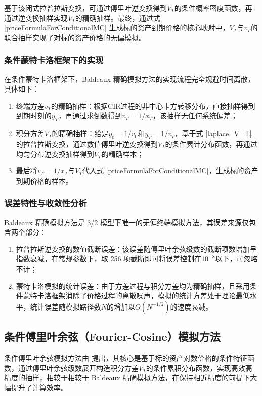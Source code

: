 基于该闭式拉普拉斯变换，可通过傅里叶逆变换得到$V_T$的条件概率密度函数，再通过逆变换抽样实现$V_T$的精确抽样。最终，通过式 \eqref{priceFormulaForConditionalMC} 生成标的资产到期价格的核心映射中，$V_T$与$v_T$的联合抽样实现了对标的资产价格的无偏模拟。

\subsubsection{条件蒙特卡洛框架下的实现}
在条件蒙特卡洛框架下，Baldeaux 精确模拟方法的实现流程完全规避时间离散，具体如下：
\begin{enumerate}
  \item 终端方差$v_T$的精确抽样：根据CIR过程的非中心卡方转移分布，直接抽样得到到期时刻的$y_T$，再通过求倒数得到$v_T = 1/x_T$，该抽样无任何系统偏差；
  \item 积分方差$V_T$的精确抽样：给定$y_0 = 1/v_0$和$y_T = 1/v_T$，基于式 \eqref{laplace_V_T} 的拉普拉斯变换，通过数值傅里叶逆变换得到$V_T$的条件累计分布函数，再通过均匀分布逆变换抽样得到$V_T$的精确样本；
  \item 最后将$v_T=1/x_T$与$V_T$代入式 \eqref{priceFormulaForConditionalMC}，生成标的资产到期价格的样本。
\end{enumerate}

\subsubsection{误差特性与收敛性分析}
Baldeaux 精确模拟方法是 3/2 模型下唯一的无偏终端模拟方法，其误差来源仅包含两个部分：
\begin{enumerate}
  \item 拉普拉斯逆变换的数值截断误差：该误差随傅里叶余弦级数的截断项数增加呈指数衰减，在常规参数下，取 256 项截断即可将误差控制在$10^{−8}$以下，可忽略不计；
  \item 蒙特卡洛模拟的统计误差：由于方差过程与积分方差均为精确抽样，且采用条件蒙特卡洛框架消除了价格过程的离散噪声，模拟的统计方差处于理论最低水平，统计误差随模拟路径数$N$的增加以$O(N^{−1/2})$的速度衰减。
\end{enumerate}

\subsection{条件傅里叶余弦（Fourier-Cosine）模拟方法}

条件傅里叶余弦模拟方法由 \citet{brignoneExactSimulationStochastic2026} 提出，其核心是基于标的资产对数价格的条件特征函数，通过傅里叶余弦级数展开构造积分方差$V_T$的条件累积分布函数，实现高效高精度的抽样，相较于相较于 Baldeaux 精确模拟方法，在保持相近精度的前提下大幅提升了计算效率。
